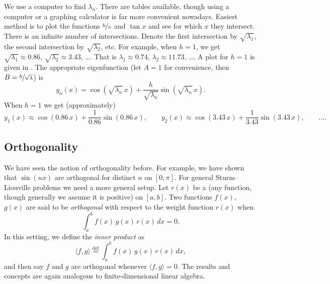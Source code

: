 \begin{example}
We use a computer to find $\lambda_n$.  There are tables available,
though using a computer or a graphing calculator
is far more convenient nowadays.
Easiest method is to plot the functions 
$\nicefrac{h}{x}$ and $\tan x$ and see for which $x$ they intersect.
There is an infinite number of intersections.  Denote
the first intersection
by $\sqrt{\lambda_1}$,
the second intersection by $\sqrt{\lambda_2}$, etc.
For example, when
$h=1$, we get $\sqrt{\lambda_1} \approx 0.86$, 
$\sqrt{\lambda_2} \approx 3.43$, \ldots.
That is $\lambda_1 \approx 0.74$, $\lambda_2 \approx 11.73$, \ldots.
A plot for $h=1$ is given in .
The appropriate eigenfunction
(let $A = 1$ for convenience, then
$B=\nicefrac{h}{\sqrt{\lambda}}$) is
\begin{equation*}
y_n(x) = \cos ( \sqrt{\lambda_n}\, x ) + \frac{h}{\sqrt{\lambda_n}}
\sin (\sqrt{\lambda_n} \, x ) .
\end{equation*}
When $h=1$ we get (approximately)
\begin{equation*}
y_1(x) \approx \cos (0.86\, x ) + \frac{1}{0.86}
\sin (0.86 \, x ) , \qquad
y_2(x) \approx \cos (3.43\, x ) + \frac{1}{3.43}
\sin (3.43 \, x ) , \qquad \ldots .
\end{equation*}
\begin{myfig}
\capstart
{}
\caption{Plot of $\frac{1}{x}$ and $\tan x$.%
\label{sl:tanx1overxfig}}
\end{myfig}
\end{example}

\subsection{Orthogonality}

We have seen the notion of orthogonality before.  For example,
we have shown that $\sin (nx)$ are orthogonal for distinct $n$ on $[0,\pi]$.
For general Sturm--Liouville problems we need a more general setup.
Let $r(x)$
be a \emph{} (any function, though generally we
assume it is positive) on $[a,b]$.  Two functions $f(x)$, $g(x)$
are said to be
\emph{orthogonal} 
with respect to the weight function
$r(x)$ when
\begin{equation*}
\int_a^b f(x) \, g(x) \, r(x) \,dx = 0 .
\end{equation*}
In this setting,
we define the \emph{inner product} as
\begin{equation*}
\langle f , g \rangle \overset{\text{def}}{=} \int_a^b f(x) \, g(x) \, r(x)
\,dx ,
\end{equation*}
and then say $f$ and $g$ are orthogonal whenever $\langle f , g \rangle = 0$.
The results and concepts are again analogous to 
finite-dimensional linear algebra.

